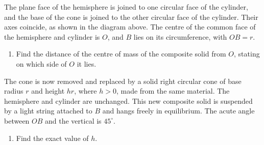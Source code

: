 \documentclass[leqno]{article}
\begin{document}
\begin{enumerate}[
  label=\textbf{\arabic*.},
  leftmargin=*,
  topsep=0pt,
  partopsep=0pt,
  parsep=0pt
]
The plane face of the hemisphere is joined to one circular face of the cylinder, and the base of the cone is joined to the other circular face of the cylinder. Their axes coincide, as shown in the diagram above. The centre of the common face of the hemisphere and cylinder is $O$, and $B$ lies on its circumference, with $OB=r$. \\
\begin{enumerate}[label=\textbf{(\alph*)}]
\item Find the distance of the centre of mass of the composite solid from $O$, stating on which side of $O$ it lies.  \\
\end{enumerate}
The cone is now removed and replaced by a solid right circular cone of base radius $r$ and height $hr$, where $h>0$, made from the same material. The hemisphere and cylinder are unchanged. This new composite solid is suspended by a light string attached to $B$ and hangs freely in equilibrium. The acute angle between $OB$ and the vertical is $45^\circ$. \\
\begin{enumerate}[label=\textbf{(\alph*)}, resume]
\item Find the exact value of $h$.  \\
\end{enumerate}

\newpage

\questionitem


\end{enumerate}
\end{document}
